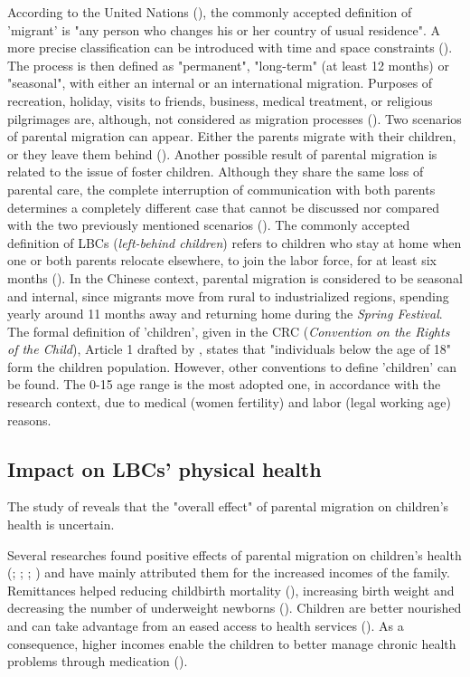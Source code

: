 According to the United Nations (\cite{united1998recommendations}), the commonly accepted definition of 'migrant' is "any person who changes his or her country of usual residence". A more precise classification can be introduced with time and space constraints (\cite{rossi2008impact}). The process is then defined as "permanent", "long-term" (at least 12 months) or "seasonal", with either an internal or an international migration. Purposes of recreation, holiday, visits to friends, business, medical treatment, or religious pilgrimages are, although, not considered as migration processes (\cite{united1998recommendations}). Two scenarios of parental migration can appear. Either the parents migrate with their children, or they leave them behind (\cite{rossi2008impact}). Another possible result of parental migration is related to the issue of foster children. Although they share the same loss of parental care, the complete interruption of communication with both parents determines a completely different case that cannot be discussed nor compared with the two previously mentioned scenarios (\cite{pilon2003foster}). The commonly accepted definition of LBCs (\textit{left-behind children}) refers to children who stay at home when one or both parents relocate elsewhere, to join the labor force, for at least six months (\cite{lu2011left}). In the Chinese context, parental migration is considered to be seasonal and internal, since migrants move from rural to industrialized regions, spending yearly around 11 months away and returning home during the \textit{Spring Festival}. The formal definition of 'children', given in the CRC (\textit{Convention on the Rights of the Child}), Article 1 drafted by \textcite{unicef1989convention}, states that "individuals below the age of 18" form the children population. However, other conventions to define 'children' can be found. The 0-15 age range is the most adopted one, in accordance with the research context, due to medical (women fertility) and labor (legal working age) reasons.

\subsection{Impact on LBCs' physical health}
\label{subsec:impact_physical_health}

The study of \textcite{guo2017effect} reveals that the "overall effect" of parental migration on children's health is uncertain. 

Several researches found positive effects of parental migration on children's health (\cite{mundial2006development}; \cite{acosta2007impact}; \cite{anton2010impact}; \cite{stillman2012impact}) and have mainly attributed them for the increased incomes of the family. Remittances helped reducing childbirth mortality (\cite{hildebrandt2005effects}), increasing birth weight and decreasing the number of underweight newborns (\cite{frank2002other}). Children are better nourished and can take advantage from an eased access to health services (\cite{nobles2006contribution}). As a consequence, higher incomes enable the children to better manage chronic health problems through medication (\cite{case2002economic}).

